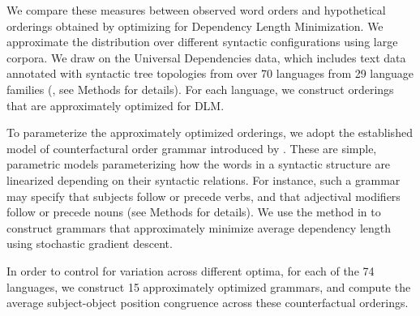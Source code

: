 \documentclass[11pt,a4paper]{article}
\newcommand\comment[1]{{\color{red}#1}}
\newcommand\mhahn[1]{{\color{red}(#1)}}
\begin{document}


We compare these measures between observed word orders and hypothetical orderings obtained by optimizing for Dependency Length Minimization. We approximate the distribution over different syntactic configurations using large corpora.
We draw on the Universal Dependencies data, which includes text data annotated with syntactic tree topologies from over 70 languages from 29 language families (\citep{zeman2020universal}, see Methods for details).
For each language, we construct orderings that are approximately optimized for DLM.

To parameterize the approximately optimized orderings, we adopt the established model of counterfactural order grammar introduced by \citet{gildea-optimizing-2007}.
These are simple, parametric models parameterizing how the words in a syntactic structure are linearized depending on their syntactic relations.
For instance, such a grammar may specify that subjects follow or precede verbs, and that adjectival modifiers follow or precede nouns (see Methods for details).
We use the method in \citet{hahn2020universals} to construct grammars that approximately minimize average dependency length using stochastic gradient descent.

In order to control for variation across different optima, for each of the 74 languages, we construct 15 approximately optimized grammars, and compute the average subject-object position congruence across these counterfactual orderings.


\end{document}
